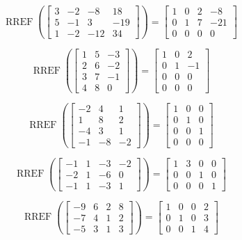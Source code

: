 \documentclass{article}
\DeclareMathOperator{\RREF}{RREF}
\begin{document}
	\[\RREF\left(\left[\begin{array}{ccc|c} 3 & -2 & -8 & 18 \\ 5 & -1 & 3 & -19 \\ 1 & -2 & -12 & 34 \end{array} \right] \right)= \left[ \begin{array}{ccc|c} 1 & 0 & 2 & -8\\ 0 & 1 & 7 & -21 \\ 0 & 0 & 0 & 0 \end{array} \right]\]
	
	
\[\RREF 
\left(\left[\begin{array}{cc|c}
1 & 5 & -3 \\
2 & 6 & -2 \\ 
3 & 7 & -1 \\ 
4 & 8 & 0
\end{array}
\right] \right)
= \left[
\begin{array}{cc|c}
1 & 0 & 2 \\
0 & 1 & -1 \\
0 & 0 & 0 \\ 
0 & 0 & 0
\end{array}
\right]\]

%
	\[\RREF 
\left(\left[\begin{array}{cc|c}
-2 & 4 & 1 \\
1 & 8 & 2 \\ 
-4 & 3 & 1 \\ 
-1 & -8 & -2
\end{array}
\right] \right)
= \left[
\begin{array}{cc|c}
1 & 0 & 0 \\
0 & 1 & 0 \\
0 & 0 & 1 \\ 
0 & 0 & 0
\end{array}
\right]\]

\[\RREF 
\left(\left[\begin{array}{ccc|c}
-1 & 1 & -3 & -2\\
-2 & 1 & -6 & 0\\ 
-1 & 1 & -3 &1
\end{array}
\right] \right)
= \left[
\begin{array}{ccc|c}
1 & 3 & 0 & 0\\
0 & 0 & 1 & 0\\ 
0 & 0 & 0 &1
\end{array}
\right]\]



\[\RREF 
\left(\left[\begin{array}{ccc|c}
-9 & 6 & 2 & 8\\
-7 & 4 & 1 & 2\\ 
-5 & 3 & 1 &3
\end{array}
\right] \right)
= \left[
\begin{array}{ccc|c}
1 & 0 & 0 & 2\\
0 & 1 & 0 & 3\\ 
0 & 0 & 1 & 4
\end{array}
\right]\]
	
\end{document}
